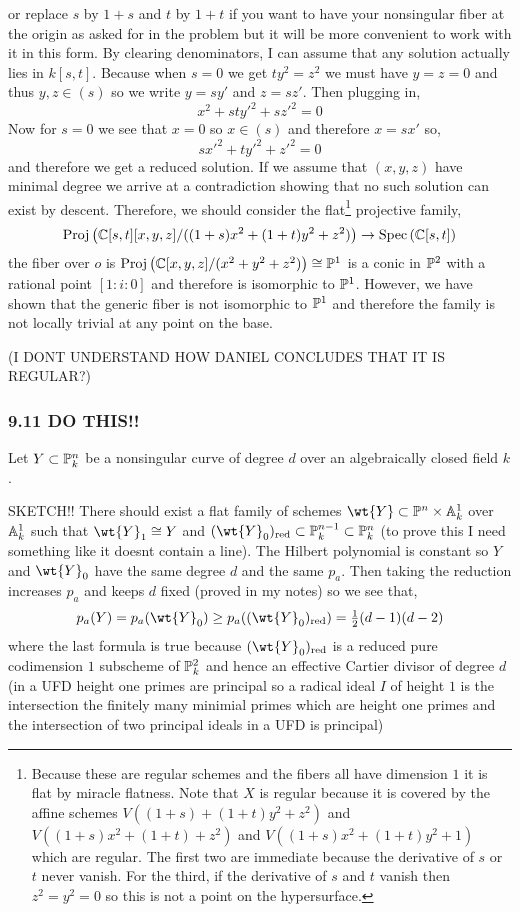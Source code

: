 \documentclass[12pt]{article}
\begin{document}
\begin{enumerate}
or replace $s$ by $1 + s$ and $t$ by $1 + t$ if you want to have your nonsingular fiber at the origin as asked for in the problem but it will be more convenient to work with it in this form. By clearing denominators, I can assume that any solution actually lies in $k[s,t]$. Because when $s = 0$ we get $t y^2 = z^2$ we must have $y = z = 0$ and thus $y,z \in (s)$ so we write $y = s y'$ and $z = s z'$. Then plugging in,
\[ x^2 + st y'^2 + s z'^2 = 0 \]
Now for $s = 0$ we see that $x = 0$ so $x \in (s)$ and therefore $x = s x'$ so,
\[ s x'^2 + t y'^2 + z'^2 = 0 \]
and therefore we get a reduced solution. If we assume that $(x,y,z)$ have minimal degree we arrive at a contradiction showing that no such solution can exist by descent. Therefore, we should consider the flat\footnote{Because these are regular schemes and the fibers all have dimension $1$ it is flat by miracle flatness. Note that $X$ is regular because it is covered by the affine schemes $V((1 + s) + (1 + t) y^2 + z^2)$ and $V((1 + s) x^2 + (1 + t) + z^2)$ and $V((1 + s) x^2 + (1 + t) y^2 + 1)$ which are regular. The first two are immediate because the derivative of $s$ or $t$ never vanish. For the third, if the derivative of $s$ and $t$ vanish then $z^2 = y^2 = 0$ so this is not a point on the hypersurface.} projective family,
\[ \Proj{\CC[s,t][x,y,z]/((1 + s) x^2 + (1 + t) y^2 + z^2)} \to \Spec{\CC[s,t]} \]
the fiber over $o$ is $\Proj{\CC[x,y,z]/(x^2 + y^2 + z^2)} \cong \P^1$ is a conic in $\P^2$ with a rational point $[1 : i : 0]$ and therefore is isomorphic to $\P^1$. However, we have shown that the generic fiber is not isomorphic to $\P^1$ and therefore the family is not locally trivial at any point on the base.

(I DONT UNDERSTAND HOW DANIEL CONCLUDES THAT IT IS REGULAR?) 
\end{enumerate}

\subsubsection{9.11 DO THIS!!}

Let $Y \subset \P^n_k$ be a nonsingular curve of degree $d$ over an algebraically closed field $k$.

SKETCH!!
There should exist a flat family of schemes $\wt{Y} \subset \P^n \times \A^1_k$ over $\A^1_k$ such that $\wt{Y}_1 \cong Y$ and $(\wt{Y}_0)_{\red} \subset \P^{n-1}_k \subset \P^n_k$ (to prove this I need something like it doesnt contain a line). The Hilbert polynomial is constant so $Y$ and $\wt{Y}_0$ have the same degree $d$ and the same $p_a$. Then taking the reduction increases $p_a$ and keeps $d$ fixed (proved in my notes) so we see that,
\[ p_a(Y) = p_a(\wt{Y}_0) \ge p_a((\wt{Y}_0)_\red) = \tfrac{1}{2} (d-1)(d-2) \]
where the last formula is true because $(\wt{Y}_0)_{\red}$ is a reduced pure codimension $1$ subscheme of $\P^2_k$ and hence an effective Cartier divisor of degree $d$ (in a UFD height one primes are principal so a radical ideal $I$ of height $1$ is the intersection the finitely many minimial primes which are height one primes and the intersection of two principal ideals in a UFD is principal)
\end{document}
